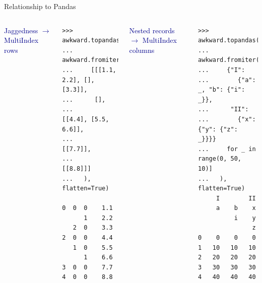 \documentclass[aspectratio=169]{beamer}
\begin{document}
\begin{frame}[fragile]{Relationship to Pandas}
\large
\vspace{0.35 cm}
\begin{columns}
\textcolor{darkblue}{Jaggedness $\to$ MultiIndex rows}

\small
\vspace{-0.2 cm}
\begin{verbatim}
>>> awkward.topandas(
...   awkward.fromiter(
...     [[[1.1, 2.2], [], [3.3]],
...      [],
...      [[4.4], [5.5, 6.6]],
...      [[7.7]],
...      [[8.8]]]
...   ), flatten=True)

0  0  0    1.1
      1    2.2
   2  0    3.3
2  0  0    4.4
   1  0    5.5
      1    6.6
3  0  0    7.7
4  0  0    8.8
\end{verbatim}

\textcolor{darkblue}{Nested records $\to$ MultiIndex columns}
\small
\vspace{-0.2 cm}
\begin{verbatim}
>>> awkward.topandas(
...   awkward.fromiter([
...     {"I":
...        {"a": _, "b": {"i": _}},
...      "II":
...        {"x": {"y": {"z": _}}}}
...     for _ in range(0, 50, 10)]
...   ), flatten=True)
     I        II
     a    b    x
          i    y
               z
0    0    0    0
1   10   10   10
2   20   20   20
3   30   30   30
4   40   40   40
\end{verbatim}

\end{columns}
\end{frame}









\begin{frame}{}
\end{frame}
\end{document}
